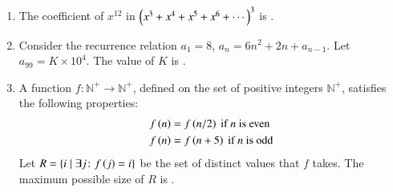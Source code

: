 \documentclass[journal,12pt,onecolumn]{IEEEtran}
\theoremstyle{remark}
\begin{document}
\begin{enumerate}
\begin{enumerate}
		\end{enumerate}
		
		\hfill{}
		\begin{enumerate}
		\end{enumerate}
		
		\item The coefficient of $x^{12}$ in $\left(x^3 + x^4 + x^5 + x^6 + \cdots\right)^3$ is \underline{\hspace{2cm}}.
		
		\hfill{}
		
		\item Consider the recurrence relation $a_1 = 8$, $a_n = 6n^2 + 2n + a_{n-1}$. Let $a_{99} = K \times 10^4$. The value of $K$ is \underline{\hspace{2cm}}.
		
		\hfill{}
		
		\item A function $f\colon \mathbb{N}^+ \rightarrow \mathbb{N}^+$, defined on the set of positive integers $\mathbb{N}^+$, satisfies the following properties:
		\begin{align*}
			f\left(n\right) &= f\left(n/2\right) \text{ if } n \text{ is even} \\
			f\left(n\right) &= f\left(n + 5\right) \text{ if } n \text{ is odd}
		\end{align*}
		Let $R = \{i \mid \exists j\colon f\left(j\right) = i\}$ be the set of distinct values that $f$ takes. The maximum possible size of $R$ is \underline{\hspace{2cm}}.
		
		\hfill{}
		

\end{enumerate}
\end{document}
